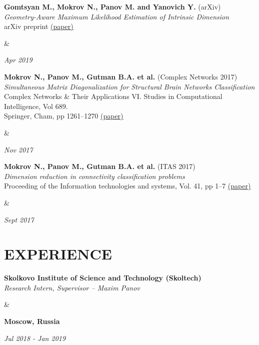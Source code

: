 \documentclass[11pt,a4paper,roman]{moderncv}
\newcommand*{\cvarticle}[7]{
    \parbox[t]{0.90\textwidth}{
    \textcolor{graycv}{\bfseries #2} ({\ithsape #3})\\
	{\itshape #4} \\
	{\footnotesize #5} \href{#6}{(#7)}\vspace{\parsep}
    }&\parbox[t]{0.10\textwidth}{
    \hfill {\itshape #1}}
}
\newcommand*{\cvpublic}[4]{
    \parbox[t]{0.78\textwidth}{
    {\bfseries #3} \\ {\itshape #4}
    }&\parbox[t]{0.22\textwidth}{
    {\hfill {\bfseries #2}}\\
    {\strut\hfill {\itshape #1}}}
}
\begin{document}

{\cvarticle{Apr 2019}
           {Gomtsyan M., Mokrov N., Panov M. and Yanovich Y.}
           {arXiv}
           {Geometry-Aware Maximum Likelihood Estimation of Intrinsic Dimension}
           {arXiv preprint}
           {https://arxiv.org/abs/1904.06151}
           {paper}}

{\cvarticle{Nov 2017}
           {Mokrov N., Panov M., Gutman B.A. et al.}
           {Complex Networks 2017}
           {Simultaneous Matrix Diagonalization for Structural Brain Networks Classification}
           {Complex Networks \& Their Applications VI. Studies in Computational Intelligence, Vol 689. \\Springer, Cham, pp 1261--1270}
           {https://arxiv.org/pdf/1710.05213.pdf}
           {paper}}

{\cvarticle{Sept 2017}
           {Mokrov N., Panov M., Gutman B.A. et al.}
           {ITAS 2017}
           {Dimension reduction in connectivity classification problems}
           {Proceeding of the Information technologies and systems, Vol. 41, pp 1--7}
           {http://itas2017.iitp.ru/media/papers/1570391567_64mOmmp.pdf}
           {paper}}

\section{EXPERIENCE}

{\cvpublic{Jul 2018 - Jan 2019}
          {Moscow, Russia}
          {Skolkovo Institute of Science and Technology (Skoltech)}
          {Research Intern, Supervisor -- Maxim Panov}
\vspace{5}
}
\end{document}
